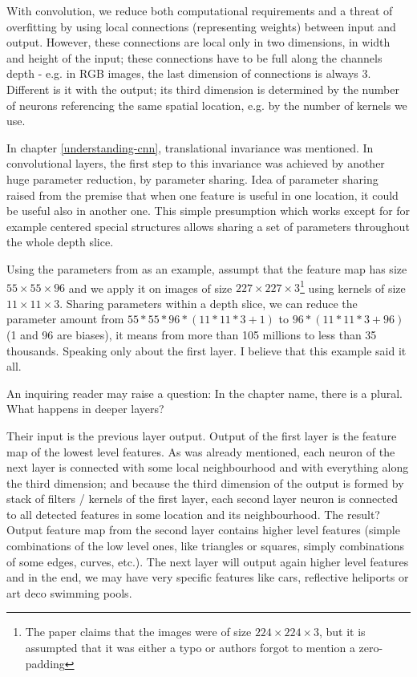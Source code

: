With convolution, we reduce both computational requirements and a threat of overfitting by using local connections (representing weights) between input and output. However, these connections are local only in two dimensions, in width and height of the input; these connections have to be full along the channels depth - e.g. in RGB images, the last dimension of connections is always 3. Different is it with the output; its third dimension is determined by the number of neurons referencing the same spatial location, e.g. by the number of kernels we use. 

In chapter \ref{understanding-cnn}, translational invariance was mentioned. In convolutional layers, the first step to this invariance was achieved by another huge parameter reduction, by parameter sharing. Idea of parameter sharing raised from the premise that when one feature is useful in one location, it could be useful also in another one. This simple presumption which works except for for example centered special structures allows sharing a set of parameters throughout the whole depth slice. 

Using the parameters from \cite{cnn-classification} as an example, assumpt that the feature map has size $55 \times 55 \times 96$ and we apply it on images of size $227 \times 227 \times 3$\footnote{The paper claims that the images were of size $224 \times 224 \times 3$, but it is assumpted that it was either a typo or authors forgot to mention a zero-padding} using kernels of size $11 \times 11 \times 3$. Sharing parameters within a depth slice, we can reduce the parameter amount from $55 * 55 * 96 * (11 * 11 * 3 + 1)$ to $96 * (11 * 11 * 3 + 96)$ (1 and 96 are biases), it means from more than 105 millions to less than 35 thousands. Speaking only about the first layer. I believe that this example said it all. 

An inquiring reader may raise a question: In the chapter name, there is a plural. What happens in deeper layers? 

Their input is the previous layer output. Output of the first layer is the feature map of the lowest level features. As was already mentioned, each neuron of the next layer is connected with some local neighbourhood and with everything along the third dimension; and because the third dimension of the output is formed by stack of filters / kernels of the first layer, each second layer neuron is connected to all detected features in some location and its neighbourhood. The result? Output feature map from the second layer contains higher level features (simple combinations of the low level ones, like triangles or squares, simply combinations of some edges, curves, etc.). The next layer will output again higher level features and in the end, we may have very specific features like cars, reflective heliports or art deco swimming pools. 

